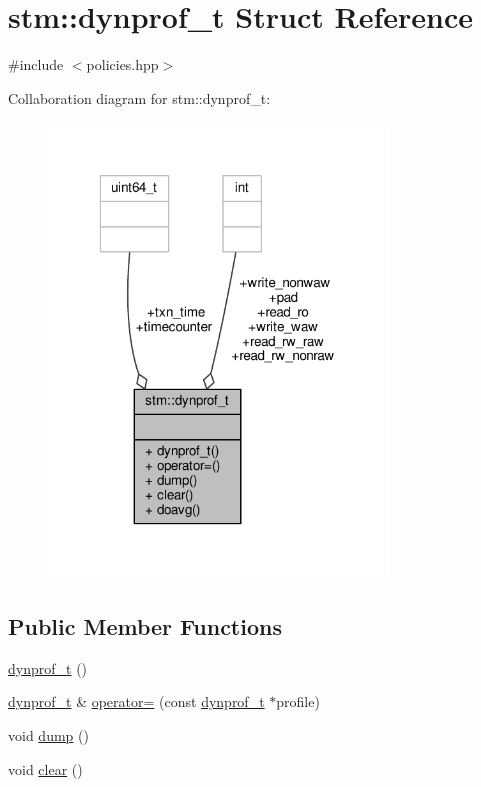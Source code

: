 \hypertarget{structstm_1_1dynprof__t}{\section{stm\-:\-:dynprof\-\_\-t Struct Reference}
\label{structstm_1_1dynprof__t}
}


{\ttfamily \#include $<$policies.\-hpp$>$}



Collaboration diagram for stm\-:\-:dynprof\-\_\-t\-:
\nopagebreak
\begin{figure}[H]
\begin{center}
\leavevmode
\includegraphics[width=256pt]{structstm_1_1dynprof__t__coll__graph}
\end{center}
\end{figure}
\subsection*{Public Member Functions}
\begin{DoxyCompactItemize}
\item 
\hyperlink{structstm_1_1dynprof__t_a6e2f084dade90e12f76bd8c29cfba11a}{dynprof\-\_\-t} ()
\item 
\hyperlink{structstm_1_1dynprof__t}{dynprof\-\_\-t} \& \hyperlink{structstm_1_1dynprof__t_afb59bdfcfff22b7a75837f4423ec15e1}{operator=} (const \hyperlink{structstm_1_1dynprof__t}{dynprof\-\_\-t} $\ast$profile)
\item 
void \hyperlink{structstm_1_1dynprof__t_a16cfdcbd81c4528cd778b587d46c94e5}{dump} ()
\item 
void \hyperlink{structstm_1_1dynprof__t_a3a563bc6d70ae8791d4d940bdeed38fd}{clear} ()
\end{DoxyCompactItemize}
